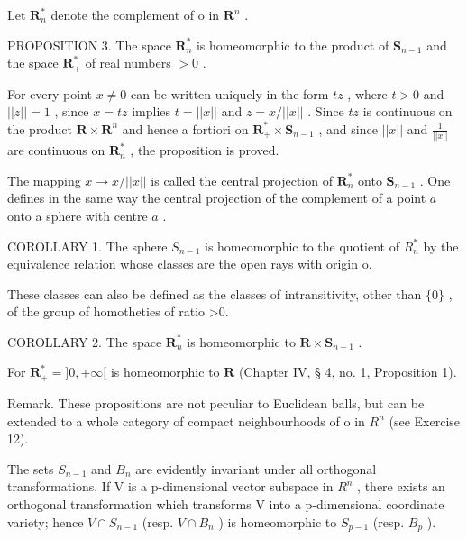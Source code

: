 Let \(\mathbf{R}_n^*\) denote the complement of o in \(\mathbf{R}^n\) .

PROPOSITION 3. The space \(\mathbf{R}_n^*\) is homeomorphic to the product of \(\mathbf{S}_{n-1}\) and the space \(\mathbf{R}_+^*\) of real numbers \(>0\) .

For every point \(x \neq 0\) can be written uniquely in the form \(tz\) , where \(t > 0\) and \(||z|| = 1\) , since \(x = tz\) implies \(t = ||x||\) and \(z = x / ||x||\) . Since \(tz\) is continuous on the product \(\mathbf{R} \times \mathbf{R}^n\) and hence a fortiori on \(\mathbf{R}_+^* \times \mathbf{S}_{n-1}\) , and since \(||x||\) and \(\frac{1}{||x||}\) are continuous on \(\mathbf{R}_n^*\) , the proposition is proved.

The mapping \(x \to x / ||x||\) is called the central projection of \(\mathbf{R}_n^*\) onto \(\mathbf{S}_{n-1}\) . One defines in the same way the central projection of the complement of a point \(a\) onto a sphere with centre \(a\) .

COROLLARY 1. The sphere \(S_{n-1}\) is homeomorphic to the quotient of \(R_{n}^{*}\) by the equivalence relation whose classes are the open rays with origin o.

These classes can also be defined as the classes of intransitivity, other than \(\{0\}\) , of the group of homotheties of ratio \textgreater0.

COROLLARY 2. The space \(\mathbf{R}_n^*\) is homeomorphic to \(\mathbf{R} \times \mathbf{S}_{n-1}\) .

For \(\mathbf{R}_{+}^{*} = ]0, +\infty[\) is homeomorphic to \(\mathbf{R}\) (Chapter IV, § 4, no. 1, Proposition 1).

Remark. These propositions are not peculiar to Euclidean balls, but can be extended to a whole category of compact neighbourhoods of o in \(R^{n}\) (see Exercise 12).

The sets \(S_{n-1}\) and \(B_{n}\) are evidently invariant under all orthogonal transformations. If V is a p-dimensional vector subspace in \(R^{n}\) , there exists an orthogonal transformation which transforms V into a p-dimensional coordinate variety; hence \(V \cap S_{n-1}\) (resp. \(V \cap B_{n}\) ) is homeomorphic to \(S_{p-1}\) (resp. \(B_{p}\) ).

